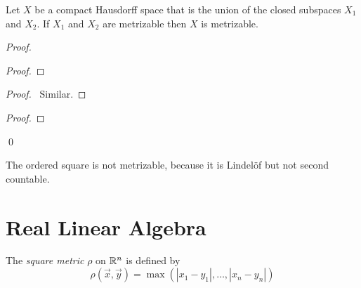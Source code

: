 \begin{proposition}
    Let $X$ be a compact Hausdorff space that is the union of the closed
    subspaces $X_1$ and $X_2$. If $X_1$ and $X_2$ are metrizable then $X$
    is metrizable.
\end{proposition}

\begin{proof}
    \pf
    \begin{proof}
    \end{proof}
    \begin{proof}
        \pf\ Similar.
    \end{proof}
    \begin{proof}
    \end{proof}
    \qed
\end{proof}

\begin{example}
    The ordered square is not metrizable, because it is Lindel\"{o}f but not second countable.
\end{example}

\section{Real Linear Algebra}

\begin{definition}
    The \emph{square metric} $\rho$ on $\mathbb{R}^n$ is defined by
    \[ \rho(\vec{x}, \vec{y}) = \max(|x_1 - y_1|, \ldots, |x_n - y_n|) \]
\end{definition}

